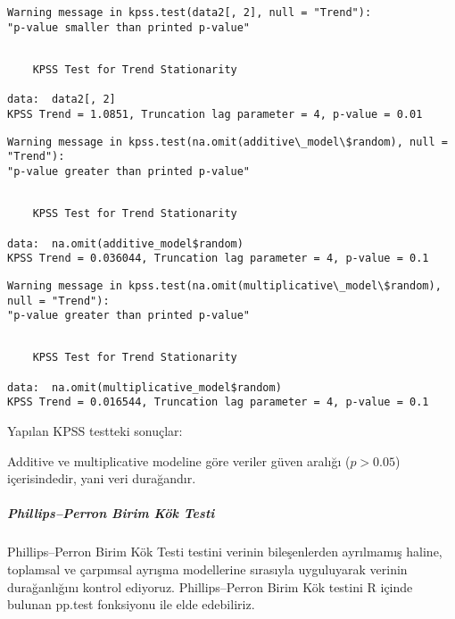 \documentclass[11pt]{article}
\begin{document}
    \begin{Verbatim}[commandchars=\\\{\}]
Warning message in kpss.test(data2[, 2], null = "Trend"):
"p-value smaller than printed p-value"
    \end{Verbatim}

    
    \begin{verbatim}

	KPSS Test for Trend Stationarity

data:  data2[, 2]
KPSS Trend = 1.0851, Truncation lag parameter = 4, p-value = 0.01

    \end{verbatim}

    
    \begin{Verbatim}[commandchars=\\\{\}]
Warning message in kpss.test(na.omit(additive\_model\$random), null = "Trend"):
"p-value greater than printed p-value"
    \end{Verbatim}

    
    \begin{verbatim}

	KPSS Test for Trend Stationarity

data:  na.omit(additive_model$random)
KPSS Trend = 0.036044, Truncation lag parameter = 4, p-value = 0.1

    \end{verbatim}

    
    \begin{Verbatim}[commandchars=\\\{\}]
Warning message in kpss.test(na.omit(multiplicative\_model\$random), null = "Trend"):
"p-value greater than printed p-value"
    \end{Verbatim}

    
    \begin{verbatim}

	KPSS Test for Trend Stationarity

data:  na.omit(multiplicative_model$random)
KPSS Trend = 0.016544, Truncation lag parameter = 4, p-value = 0.1

    \end{verbatim}

    
    Yapılan KPSS testteki sonuçlar:

Additive ve multiplicative modeline göre veriler güven aralığı
(\(p>0.05\)) içerisindedir, yani veri durağandır.

    \subparagraph{Phillips--Perron Birim Kök
Testi}\label{phillipsperron-birim-kuxf6k-testi}
\pagebreak
Phillips--Perron Birim Kök Testi testini verinin bileşenlerden
ayrılmamış haline, toplamsal ve çarpımsal ayrışma modellerine sırasıyla
uyguluyarak verinin durağanlığını kontrol ediyoruz. Phillips--Perron
Birim Kök testini R içinde bulunan pp.test fonksiyonu ile elde
edebiliriz.
\end{document}
